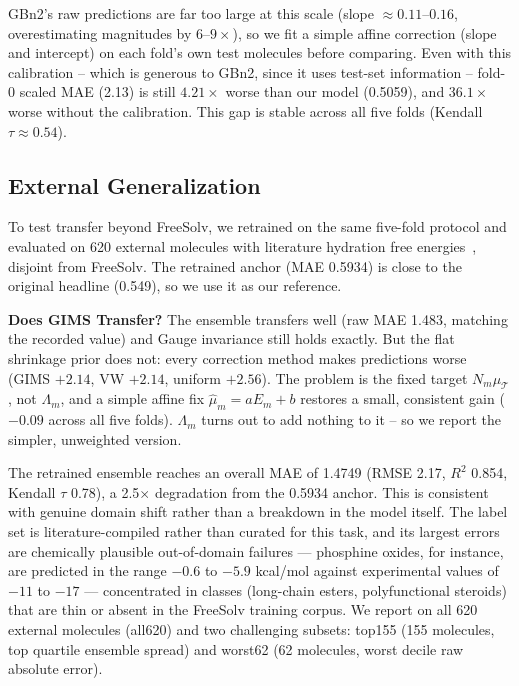 \documentclass{article}
\begin{document}
GBn2's raw predictions are far too large at
this scale (slope $\approx0.11$--$0.16$, overestimating magnitudes by
$6$--$9\times$), so we fit a simple affine correction (slope and intercept)
on each fold's own test molecules before comparing. Even with this
calibration -- which is generous to GBn2, since it uses test-set information
-- fold-0 scaled MAE (2.13) is still $4.21\times$ worse than our model
(0.5059), and $36.1\times$ worse without the calibration. This gap is
stable across all five folds (Kendall $\tau\approx0.54$).

\subsection{External Generalization}
\label{subsec:external}

To test transfer beyond FreeSolv, we retrained on the same five-fold
protocol and evaluated on 620 external molecules with literature hydration
free energies~\cite{vermeire2021}, disjoint from FreeSolv. The retrained
anchor (MAE 0.5934) is close to the original headline (0.549), so we use it
as our reference.

\textbf{Does GIMS Transfer?} The ensemble transfers well (raw MAE 1.483,
matching the recorded value) and Gauge invariance still holds exactly. But
the flat shrinkage prior does not: every correction method makes predictions
worse (GIMS $+2.14$, VW $+2.14$, uniform $+2.56$). The problem is the fixed
target $N_m\mu_{\mathcal T}$, not $\Lambda_m$, and a simple affine fix
$\hat\mu_m=aE_m+b$ restores a small, consistent gain ($-0.09$ across all
five folds). $\Lambda_m$ turns out to add nothing to it -- so we report
the simpler, unweighted version. 



The retrained ensemble reaches an overall MAE of 1.4749 (RMSE 2.17, $R^2$
0.854, Kendall $\tau$ 0.78), a 2.5$\times$ degradation from the 0.5934
anchor. This is consistent with genuine domain shift rather than a
breakdown in the model itself. The label set is literature-compiled rather
than curated for this task, and its largest errors are chemically plausible
out-of-domain failures — phosphine oxides, for instance, are predicted in
the range $-0.6$ to $-5.9$ kcal/mol against experimental values of $-11$ to
$-17$ — concentrated in classes (long-chain esters, polyfunctional
steroids) that are thin or absent in the FreeSolv training corpus. We report on all 620 external molecules (all620) and two challenging subsets: top155 (155 molecules, top quartile ensemble spread) and worst62 (62 molecules, worst decile raw absolute error).
\end{document}
